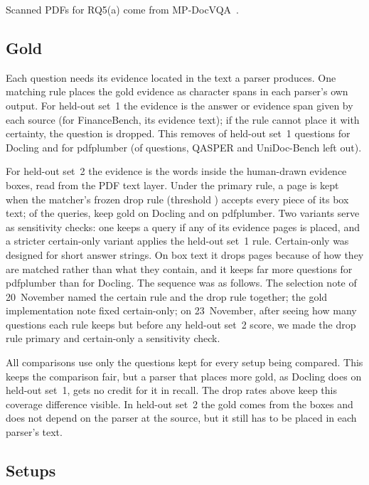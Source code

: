 Scanned PDFs for RQ5(a) come from MP-DocVQA~\cite{tito2023mpdocvqa}.

\subsection{Gold}\label{sec:gold}

Each question needs its evidence located in the text a parser produces. One
matching rule places the gold evidence as character spans in each parser's
own output. For held-out set~1 the evidence is the answer or evidence span given by each
source (for FinanceBench, its evidence text); if the rule cannot place it with certainty, the question is dropped.
This removes \CoverageHeldOutDoclingShare{} of held-out set~1 questions for Docling and \CoverageHeldOutPdfplumberShare{} for
pdfplumber (of \CoverageHeldOutDoclingTotal{} questions, QASPER and UniDoc-Bench
left out).

For held-out set~2 the evidence is the words inside the human-drawn evidence
boxes, read from the PDF text layer. Under the primary rule, a page is kept
when the matcher's frozen drop rule (threshold \GoldDropThreshold{}) accepts every piece of
its box text; of the \HTwoQueries{} queries, \HTwoKeptDocling{} keep gold on Docling and
\HTwoKeptPdfplumber{} on pdfplumber. Two variants serve as sensitivity checks: one keeps a query if
any of its evidence pages is placed, and a stricter certain-only variant
applies the held-out set~1 rule. Certain-only was designed for short answer
strings. On box text it drops pages because of how they are matched rather
than what they contain, and it keeps far more questions for pdfplumber than
for Docling. The sequence was as follows. The selection note of 20~November named the
certain rule and the drop rule together; the gold implementation note fixed
certain-only; on 23~November, after seeing how many questions each rule keeps but
before any held-out set~2 score, we made the drop rule primary and certain-only
a sensitivity check.

All comparisons use only the questions kept for every setup being compared.
This keeps the comparison fair, but a parser that places more gold, as Docling does on held-out set~1, gets no credit for it in recall. The drop rates above keep this coverage
difference visible. In held-out set~2 the gold comes from
the boxes and does not depend on the parser at the source, but it still has
to be placed in each parser's text.

\subsection{Setups}\label{sec:setups}

